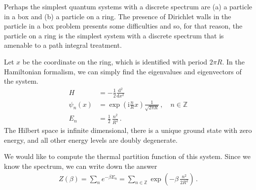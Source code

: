 \documentclass{article}
\renewcommand{\d}{\text{d}}
\renewcommand{\i}{\text{i}}
\begin{document}
Perhaps the simplest quantum systems with a discrete spectrum are (a) a particle in a box and (b) a particle on a ring.
The presence of Dirichlet walls in the particle in a box problem presents some difficulties and so,  for that reason,   the particle on a ring is the simplest system with a discrete spectrum that is amenable to a path integral treatment.

Let $x$ be the coordinate on the ring,  which is identified with period $2\pi R$.
In the Hamiltonian formalism,  we can simply find the eigenvalues and eigenvectors of the system.
\begin{equation}
\begin{aligned}
H &= - \frac{1}{2} \frac{\d^2}{\d x^2} \\
\psi_n(x) &=  \exp\left(\i  \frac{n}{R} x \right) \frac{1}{\sqrt{2\pi R}} \,,\quad n \in \mathbb{Z} \\
E_n &= \frac{1}{2} \,  \frac{n^2}{R^2}\,.
\end{aligned}
\end{equation}
The Hilbert space is infinite dimensional, there is a unique ground state with zero energy,  and all other energy levels are doubly degenerate.

We would like to compute the thermal partition function of this system.
Since we know the spectrum,  we can write down the answer
\begin{align}
Z(\beta) = \sum_n e^{-\beta E_n} = \sum_{n\in \mathbb{Z}} \exp \left( 
- \beta \, \frac{n^2}{2R^2}
\right) \, .
\label{zbetaparticlering}
\end{align}
\end{document}

